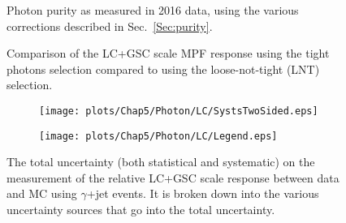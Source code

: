 \begin{figure}[!ht]
  \begin{center}
  \end{center}
  \caption[Photon purity in $\gamma$+jet events, 2016]
  {\small Photon purity as measured in 2016 data, using the various corrections described in Sec.~\ref{Sec:purity}. }
  \label{plot:GJetLC2016LNTApp}
\end{figure}

\begin{figure}[!ht]
  \begin{center}
  \end{center}
  \caption[LC scale response using $\gamma$+jet in 2016 using loose-not-tight photons]
  {\small Comparison of the LC+GSC scale MPF response using the tight photons selection compared to using the loose-not-tight (LNT) selection.}
  \label{plot:GJetLC2016LNTApp}
\end{figure}




\begin{figure}[!ht]
\captionsetup[subfigure]{labelformat=empty}
 \begin{center}
   \begin{subfigure}{0.55\textwidth}
     \hspace{-3cm}
     \texttt{[image: plots/Chap5/Photon/LC/SystsTwoSided.eps]}
   \end{subfigure}
   \begin{subfigure}{0.55\textwidth}     \hspace{-3cm}
     \texttt{[image: plots/Chap5/Photon/LC/Legend.eps]}
   \end{subfigure}
 \end{center}
 \caption[Uncertainty on the LC+GSC scale response measurement using $\gamma$+jet]
 {\small The total uncertainty (both statistical and systematic) on the measurement of the relative LC+GSC scale response between data and MC using $\gamma$+jet events.  It is broken down into the various uncertainty sources that go into the total uncertainty.  }
 \label{Fig:GJetSystsLC2016}
\end{figure}

